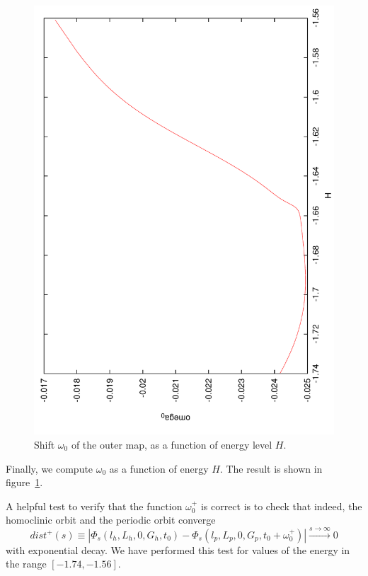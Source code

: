 \documentclass[a4paper]{amsart}
\theoremstyle{remark}
\begin{document}
\begin{figure}
\includegraphics[angle=-90,width=\textwidth]{figs/omegas}
\caption{Shift $\omega_0$ of the outer map, as a function of energy
level $H$.}
\label{fig:omegas}
\end{figure}

Finally, we compute $\omega_0$ as a function of energy $H$. The
result is shown in figure~\ref{fig:omegas}.

A helpful test to verify that the function $\omega_0^+$ is correct is
to check that indeed, the homoclinic orbit and the periodic orbit
converge
\[ dist^+(s) \equiv |\Phi_s(l_h,L_h,0,G_h,t_0) -
\Phi_s(l_p,L_p,0,G_p,t_0+\omega_0^+)| \xrightarrow{s\to\infty} 0 \]
with exponential decay. We have performed this test for values of the
energy in the range $[-1.74,-1.56]$. 
\end{document}
